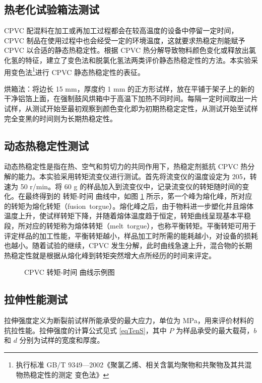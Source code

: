 \subsection{热老化试验箱法测试}
CPVC 配混料在加工或再加工过程都会在较高温度的设备中停留一定时间，CPVC 制品在使用过程中也会经受一定的环境温度，这就要求热稳定剂能赋予 CPVC 以合适的静态热稳定性。根据 CPVC 热分解导致物料颜色变化或释放出氯化氢的特征，建立了变色法和脱氯化氢法两类评价静态热稳定性的方法。本实验采用变色法\footnote{执行标准 GB/T 9349—2002《聚氯乙烯、相关含氯均聚物和共聚物及其共混物热稳定性的测定 变色法》}进行 CPVC 静态热稳定性的表征。\par
烘箱法：将边长 15 mm，厚度约 1 mm 的正方形试样，放在平铺于架子上的新的干净铝箔上面，在强制鼓风烘箱中于高温下加热不同时间。每隔一定时间取出一片试样，从测试开始至最初观察到颜色变化即为初期热稳定定性，从测试开始至试样完全变黑的时间则为长期热稳定性。

\subsection{动态热稳定性测试}\label{sectionHakee}
动态热稳定性是指在热、空气和剪切力的共同作用下，热稳定剂抵抗 CPVC 热分解的能力。本实验采用转矩流变仪进行测试。首先将流变仪的温度设定为 205\cd，转速为 50 r/min。将 60 g 的样品加入到流变仪中，记录流变仪的转矩随时间的变化。在最终得到的 转矩-时间 曲线中，如图 \ref{figExHakee} 所示，笫一个峰为熔化峰，所对应的转矩为熔化转矩（fusion torgue）。熔化峰之后，由于物料进一步塑化并且熔体温度上升，使试样转矩下降，并随着熔体温度趋于恒定，转矩曲线呈现基本平稳段，所对应的转矩称为熔体转矩（melt torgue），也称平衡转矩。平衡转矩可用于评定样品的加工性能，平衡转矩越小，样品加工时所需的能耗越小，对设备的损耗也越小。随着试验的继续，CPVC 发生分解，此时曲线急速上升，混合物的长期热稳定性就是根据从熔化峰到转矩突然增大点所经历的时间来评定。

\begin{figure}[!htb]
    \begin{center}
        
    \end{center}
    \caption{CPVC 转矩-时间 曲线示例图}
    \label{figExHakee}
\end{figure}

\subsection{拉伸性能测试}
拉伸强度定义为断裂前试样所能承受的最大应力，单位为 MPa，用来评价材料的抗拉性能。拉伸强度的计算公式见式 \eqref{eqTenS}，其中 $P$ 为样品承受的最大载荷，$b$ 和 $d$ 分别为试样的宽度和厚度。

